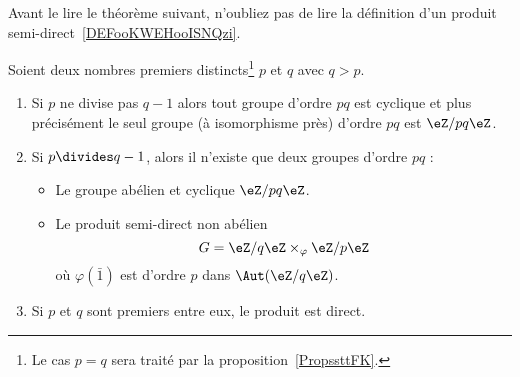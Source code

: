 Avant le lire le théorème suivant, n'oubliez pas de lire la définition d'un produit semi-direct~\ref{DEFooKWEHooISNQzi}.
\begin{theorem} \label{ThoLnTMBy}
    Soient deux nombres premiers distincts\footnote{Le cas \( p=q\) sera traité par la proposition~\ref{PropssttFK}.} \( p\) et \( q\) avec \( q>p\).
    \begin{enumerate}
        \item
    Si \( p\) ne divise pas \( q-1\) alors tout groupe d'ordre \( pq\) est cyclique et plus précisément le seul groupe (à isomorphisme près) d'ordre \( pq\) est \( \eZ/pq\eZ\).
\item       \label{ITEMooFQXIooFLAiUD}
        Si \( p\divides q-1\), alors il n'existe que deux groupes d'ordre \( pq\) :
        \begin{itemize}
            \item Le groupe abélien et cyclique \( \eZ/pq\eZ\).
            \item Le produit semi-direct non abélien
                \begin{equation}    \label{EqNuuTRE}
                    G=\eZ/q\eZ\times_{\varphi}\eZ/p\eZ
                \end{equation}
                où \( \varphi(\bar 1)\) est d'ordre \( p\) dans \( \Aut(\eZ/q\eZ)\).
        \end{itemize}

    \item

        Si \( p\) et \( q\) sont premiers entre eux, le produit est direct.
    \end{enumerate}
\end{theorem}

